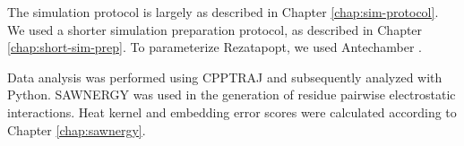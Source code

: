 The simulation protocol is largely as described in Chapter \ref{chap:sim-protocol}. We used a shorter simulation preparation protocol, as described in Chapter \ref{chap:short-sim-prep}. To parameterize Rezatapopt, we used Antechamber \parencite{wangAutomaticAtomType2006}. 

Data analysis was performed using CPPTRAJ and subsequently analyzed with Python. SAWNERGY was used in the generation of residue pairwise electrostatic interactions. Heat kernel and embedding error scores were calculated according to Chapter \ref{chap:sawnergy}.